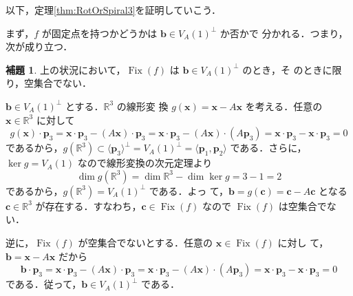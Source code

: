 \documentclass[11pt, uplatex, dvipdfmx, titlepage]{jsarticle}
\makeatletter
\DeclareMathOperator{\Fix}{Fix}
\renewenvironment{proof}[1][\proofname]{\par
  \pushQED{\qed}%
  \normalfont \topsep6\p@\@plus6\p@\relax
  \trivlist
  \item[\hskip\labelsep
         \bfseries
    {#1}]\ignorespaces
}{%
  \popQED\endtrivlist\@endpefalse
}
\theoremstyle{definition}
\newtheorem{lemma}{補題}[section]
\renewcommand{\proofname}{\textbf{証明}}
\makeatother
\begin{document}
以下，定理\ref{thm:RotOrSpiral3}を証明していこう．

まず，$f$ が固定点を持つかどうかは $\bm{b} \in V_A(1)^{\perp}$ か否かで
分かれる．つまり，次が成り立つ．

\begin{lemma}\label{lem:RotOrSpiral3}
  上の状況において，$\Fix(f)$ は $\bm{b} \in V_A(1)^{\perp}$ のとき，そ
  のときに限り，空集合でない．
\end{lemma}

\begin{proof}
  $\bm{b} \in V_A(1)^{\perp}$ とする．$\mathbb{R}^3$ の線形変
  換 $g(\bm{x}) = \bm{x}-A\bm{x}$ を考える．任意の $\bm{x} \in
  \mathbb{R}^3$ に対して
  \[
    g(\bm{x}) \cdot  \bm{p}_3 = \bm{x}\cdot \bm{p}_3 - (A\bm{x})\cdot \bm{p}_3 =
    \bm{x}\cdot \bm{p}_3 -(A\bm{x}) \cdot (A\bm{p}_3) =\bm{x} \cdot \bm{p}_3 -
    \bm{x}\cdot \bm{p}_3 = 0
  \]
  であるから，$g(\mathbb{R}^3) \subset \langle \bm{p}_3
  \rangle^{\perp}=V_A(1)^{\perp}=\langle \bm{p}_1, \bm{p}_2\rangle$
  である．さらに，$\ker g = V_A(1)$ なので線形変換の次元定理より
  \[
    \dim g(\mathbb{R}^3) = \dim \mathbb{R}^3 - \dim \ker g = 3 -1 =2
  \]
  であるから，$g(\mathbb{R}^3) = V_A(1)^{\perp}$ である．よっ
  て，$\bm{b} = g(\bm{c}) = \bm{c} - A\bm{c}$ となる
  $\bm{c} \in \mathbb{R}^3$ が存在する．すなわち，$\bm{c} \in \Fix(f)$
  なので $\Fix(f)$ は空集合でない．

  逆に，$\Fix(f)$ が空集合でないとする．任意の $\bm{x} \in \Fix(f)$ に対し
  て， $\bm{b} = \bm{x} - A\bm{x}$ だから
  \[
    \bm{b}\cdot \bm{p}_3 = \bm{x} \cdot \bm{p}_3 - (A\bm{x})\cdot  \bm{p}_3
    =\bm{x} \cdot \bm{p}_3 - (A\bm{x})\cdot ( A\bm{p}_3)
    =\bm{x}\cdot  \bm{p}_3 - \bm{x}\cdot  \bm{p}_3 = 0
  \]
  である．従って，$\bm{b} \in V_A(1)^{\perp}$ である．
\end{proof}
\end{document}
